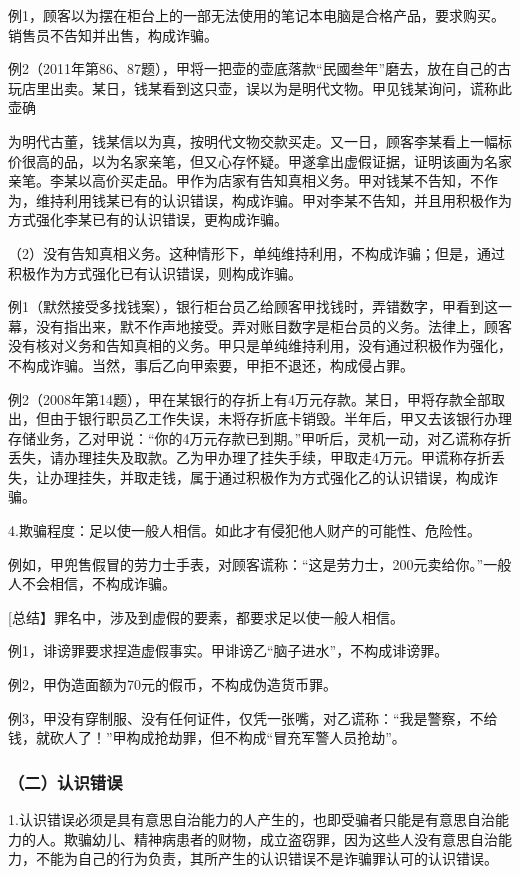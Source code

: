 例1，顾客以为摆在柜台上的一部无法使用的笔记本电脑是合格产品，要求购买。销售员不告知并出售，构成诈骗。

例2（2011年第86、87题），甲将一把壶的壶底落款“民國叁年”磨去，放在自己的古玩店里出卖。某日，钱某看到这只壶，误以为是明代文物。甲见钱某询问，谎称此壶确

为明代古董，钱某信以为真，按明代文物交款买走。又一日，顾客李某看上一幅标价很高的品，以为名家亲笔，但又心存怀疑。甲遂拿出虚假证据，证明该画为名家亲笔。李某以高价买走品。甲作为店家有告知真相义务。甲对钱某不告知，不作为，维持利用钱某已有的认识错误，构成诈骗。甲对李某不告知，并且用积极作为方式强化李某已有的认识错误，更构成诈骗。

（2）没有告知真相义务。这种情形下，单纯维持利用，不构成诈骗；但是，通过积极作为方式强化已有认识错误，则构成诈骗。

例1（默然接受多找钱案），银行柜台员乙给顾客甲找钱时，弄错数字，甲看到这一幕，没有指出来，默不作声地接受。弄对账目数字是柜台员的义务。法律上，顾客没有核对义务和告知真相的义务。甲只是单纯维持利用，没有通过积极作为强化，不构成诈骗。当然，事后乙向甲索要，甲拒不退还，构成侵占罪。

例2（2008年第14题），甲在某银行的存折上有4万元存款。某日，甲将存款全部取出，但由于银行职员乙工作失误，未将存折底卡销毁。半年后，甲又去该银行办理存储业务，乙对甲说：“你的4万元存款已到期。”甲听后，灵机一动，对乙谎称存折丢失，请办理挂失及取款。乙为甲办理了挂失手续，甲取走4万元。甲谎称存折丢失，让办理挂失，并取走钱，属于通过积极作为方式强化乙的认识错误，构成诈骗。

4.欺骗程度：足以使一般人相信。如此才有侵犯他人财产的可能性、危险性。

例如，甲兜售假冒的劳力士手表，对顾客谎称：“这是劳力士，200元卖给你。”一般人不会相信，不构成诈骗。

[总结】罪名中，涉及到虚假的要素，都要求足以使一般人相信。

例1，诽谤罪要求捏造虚假事实。甲诽谤乙“脑子进水”，不构成诽谤罪。

例2，甲伪造面额为70元的假币，不构成伪造货币罪。

例3，甲没有穿制服、没有任何证件，仅凭一张嘴，对乙谎称：“我是警察，不给钱，就砍人了！”甲构成抢劫罪，但不构成“冒充军警人员抢劫”。

\subsubsection*{（二）认识错误}

1.认识错误必须是具有意思自治能力的人产生的，也即受骗者只能是有意思自治能力的人。欺骗幼儿、精神病患者的财物，成立盗窃罪，因为这些人没有意思自治能力，不能为自己的行为负责，其所产生的认识错误不是诈骗罪认可的认识错误。

